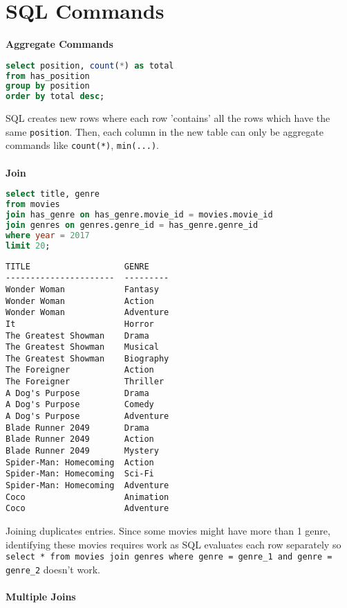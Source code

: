\documentclass[12pt,a4paper]{article} %
\begin{document}
\section{SQL Commands}
\textbf{Aggregate Commands}
\begin{lstlisting}[language=SQL]
select position, count(*) as total
from has_position
group by position
order by total desc;
\end{lstlisting}
SQL creates new rows where each row 'contains' all the rows which have the same \verb|position|. Then, each column in the new table can only be aggregate commands like \verb|count(*)|, \verb|min(...)|.
\\\\
\textbf{Join}
\begin{lstlisting}[language=SQL]
select title, genre
from movies
join has_genre on has_genre.movie_id = movies.movie_id
join genres on genres.genre_id = has_genre.genre_id
where year = 2017
limit 20;


\end{lstlisting}
\begin{lstlisting}
TITLE                   GENRE
----------------------  ---------
Wonder Woman            Fantasy
Wonder Woman            Action
Wonder Woman            Adventure
It                      Horror
The Greatest Showman    Drama
The Greatest Showman    Musical
The Greatest Showman    Biography
The Foreigner           Action
The Foreigner           Thriller
A Dog's Purpose         Drama
A Dog's Purpose         Comedy
A Dog's Purpose         Adventure
Blade Runner 2049       Drama
Blade Runner 2049       Action
Blade Runner 2049       Mystery
Spider-Man: Homecoming  Action
Spider-Man: Homecoming  Sci-Fi
Spider-Man: Homecoming  Adventure
Coco                    Animation
Coco                    Adventure
\end{lstlisting}
Joining duplicates entries. Since some movies might have more than 1 genre, identifying these movies requires work as SQL evaluates each row separately so \verb|select * from movies join genres where genre = genre_1 and genre = genre_2| doesn't work.
\\\\
\textbf{Multiple Joins}
\end{document}
